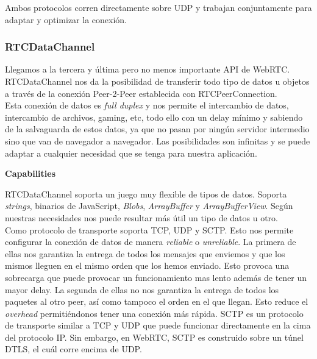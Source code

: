 Ambos protocolos corren directamente sobre UDP y trabajan conjuntamente para adaptar y optimizar la conexión.\\


\subsubsection{RTCDataChannel}

Llegamos a la tercera y última pero no menos importante API de WebRTC. RTCDataChannel nos da la posibilidad de transferir todo tipo de datos u objetos a través de la conexión Peer-2-Peer establecida con RTCPeerConnection.\\

Esta conexión de datos es \textit{full duplex} y nos permite el intercambio de datos, intercambio de archivos, gaming, etc, todo ello con un delay mínimo y sabiendo de la salvaguarda de estos datos, ya que no pasan por ningún servidor intermedio sino que van de navegador a navegador. Las posibilidades son infinitas y se puede adaptar a cualquier necesidad que se tenga para nuestra aplicación.\\

\begin{normalsize}
\noindent \textbf{Capabilities}\\
\end{normalsize}

RTCDataChannel soporta un juego muy flexible de tipos de datos. Soporta \textit{strings}, binarios de JavaScript, \textit{Blobs}, \textit{ArrayBuffer} y \textit{ArrayBufferView}. Según nuestras necesidades nos puede resultar más útil un tipo de datos u otro.\\

Como protocolo de transporte soporta TCP, UDP y SCTP. Esto nos permite configurar la conexión de datos de manera \textit{reliable} o \textit{unreliable}. La primera de ellas nos garantiza la entrega de todos los mensajes que enviemos y que los mismos lleguen en el mismo orden que los hemos enviado. Esto provoca una sobrecarga que puede provocar un funcionamiento mas lento además de tener un mayor delay. La segunda de ellas no nos garantiza la entrega de todos los paquetes al otro peer, así como tampoco el orden en el que llegan. Esto reduce el \textit{overhead} permitiéndonos tener una conexión más rápida. SCTP es un protocolo de transporte similar a TCP y UDP que puede funcionar directamente en la cima del protocolo IP. Sin embargo, en WebRTC, SCTP es construido sobre un túnel DTLS, el cuál corre encima de UDP.

